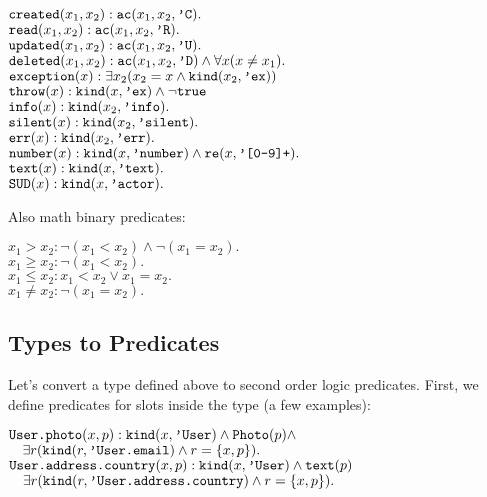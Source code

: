 \documentclass{article}
\begin{document}
        \begin{maths}
        $\mbox{\texttt{created}}(x_1, x_2): \mbox{\texttt{ac}}(x_1, x_2, \mbox{\texttt{'C}}). $ \\
        $\mbox{\texttt{read}}(x_1, x_2): \mbox{\texttt{ac}}(x_1, x_2, \mbox{\texttt{'R}}). $ \\
        $\mbox{\texttt{updated}}(x_1, x_2): \mbox{\texttt{ac}}(x_1, x_2, \mbox{\texttt{'U}}). $ \\
        $\mbox{\texttt{deleted}}(x_1, x_2): \mbox{\texttt{ac}}(x_1, x_2, \mbox{\texttt{'D}}) \wedge \forall x (x \neq x_1). $ \\
        $\mbox{\texttt{exception}}(x): \exists x_2 (x_2 = x \wedge \mbox{\texttt{kind}}(x_2, \mbox{\texttt{'ex}}))$ \\
        $\mbox{\texttt{throw}}(x): \mbox{\texttt{kind}}(x, \mbox{\texttt{'ex}}) \wedge \neg \mbox{\texttt{true}}$ \\
        $\mbox{\texttt{info}}(x): \mbox{\texttt{kind}}(x_2, \mbox{\texttt{'info}}). $ \\
        $\mbox{\texttt{silent}}(x): \mbox{\texttt{kind}}(x_2, \mbox{\texttt{'silent}}). $ \\
        $\mbox{\texttt{err}}(x): \mbox{\texttt{kind}}(x_2, \mbox{\texttt{'err}}). $ \\
        $\mbox{\texttt{number}}(x): \mbox{\texttt{kind}}(x, \mbox{\texttt{'number}}) \wedge \mbox{\texttt{re}}(x, \mbox{\texttt{'[0-9]+}}).$ \\
        $\mbox{\texttt{text}}(x): \mbox{\texttt{kind}}(x, \mbox{\texttt{'text}}).$ \\
        $\mbox{\texttt{SUD}}(x): \mbox{\texttt{kind}}(x, \mbox{\texttt{'actor}}).$ \\
        \end{maths}

        Also math binary predicates:

        \begin{maths}
        $x_1 > x_2: \neg(x_1 < x_2) \wedge \neg(x_1 = x_2). $ \\
        $x_1 \geq x_2: \neg (x_1 < x_2). $ \\
        $x_1 \leq x_2: x_1 < x_2 \vee x_1 = x_2. $ \\
        $x_1 \neq x_2: \neg (x_1 = x_2). $ \\
        \end{maths}

    \subsection{Types to Predicates}

        Let's convert a type defined above to second order logic predicates.
        First, we define predicates for slots inside the type (a few examples):

        \begin{maths}
        $\mbox{\texttt{User.photo}}(x, p): \mbox{\texttt{kind}}(x, \mbox{\texttt{'User}}) \wedge \mbox{\texttt{Photo}}(p) \wedge$ \\
        $\quad \exists r (\mbox{\texttt{kind}}(r, \mbox{\texttt{'User.email}}) \wedge r = \{x, p\}). $ \\
        $\mbox{\texttt{User.address.country}}(x, p): \mbox{\texttt{kind}}(x, \mbox{\texttt{'User}}) \wedge \mbox{\texttt{text}}(p)$ \\
        $\quad \exists r (\mbox{\texttt{kind}}(r, \mbox{\texttt{'User.address.country}}) \wedge r = \{x, p\}). $ \\
        \end{maths}
\end{document}
